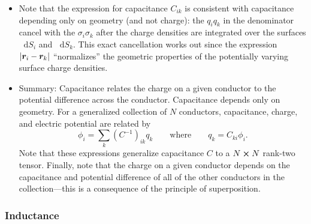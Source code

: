 \documentclass[11pt, a4paper]{article}
\newcommand{\diff}{\mathop{}\!\mathrm{d}} %
\newcommand{\eqtext}[1]{\qquad \text{#1} \qquad}
\renewcommand{\vec}[1]{\bm{#1}} %
\renewcommand{\r}{\vec{r}}
\begin{document}
\begin{itemize}
	\item Note that the expression for capacitance $ C_{ik} $ is consistent with capacitance depending only on geometry (and not charge): the $ q_{i}q_{k} $ in the denominator cancel with the $ \sigma_{i} \sigma_{k} $ after the charge densities are integrated over the surfaces $ \diff S_{i} $ and $ \diff S_{k} $. This exact cancellation works out since the expression $ \abs{\r_{i} - \r_{k}} $ ``normalizes'' the geometric properties of the potentially varying surface charge densities. 

	\item Summary: Capacitance relates the charge on a given conductor to the potential difference across the conductor. Capacitance depends only on geometry. For a generalized collection of $ N $ conductors, capacitance, charge, and electric potential are related by
	\begin{equation*}
		\phi_{i} = \sum_{k} (C^{-1})_{ik}q_{k} \eqtext{where} q_{k} = C_{ki}\phi_{i}.
	\end{equation*}
	Note that these expressions generalize capacitance $ C $  to a $ N\cross N $ rank-two tensor. Finally, note that the charge on a given conductor depends on the capacitance and potential difference of all of the other conductors in the collection---this is a consequence of the principle of superposition. 
	
\end{itemize}

\subsubsection{Inductance}
\end{document}

